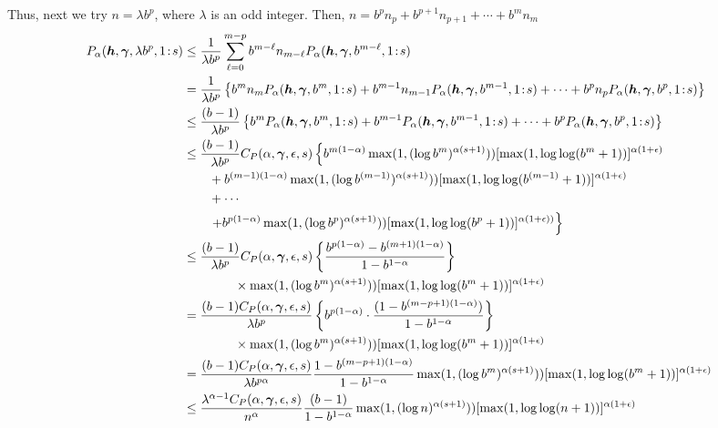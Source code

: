 \documentclass{iitthesis-au} %
\newcommand{\onetos}{1\!:\!s}
\newcommand{\FredNote}[1]{{\color{blue}#1}}
\begin{document}
Thus, next we try $n = \lambda b^p$, where $\lambda$ is an odd integer. Then, $n = b^pn_p + b^{p+1}n_{p+1} + \cdots + b^m n_m$
\begin{align*}
    P_\alpha(\vh,\vgamma,\lambda b^p,\onetos)
    & \le \frac {1}{\lambda b^p} \sum_{\ell = 0}^{m-p} b^{m-\ell} n_{m -\ell} P_\alpha(\vh,\vgamma,b^{m-\ell},\onetos) \\
    &= \frac {1}{\lambda b^p} \left\{b^m n_m P_\alpha(\vh,\vgamma,b^m,\onetos) + b^{m-1} n_{m-1} P_\alpha(\vh,\vgamma,b^{m-1},\onetos) + \cdots + b^p n_p P_\alpha(\vh,\vgamma,b^p,\onetos) 
    \right\} \\ 
    & \le \frac {(b-1)}{\lambda b^p} \left\{b^m  P_\alpha(\vh,\vgamma,b^m,\onetos) + b^{m-1}  P_\alpha(\vh,\vgamma,b^{m-1},\onetos) + \cdots + b^p  P_\alpha(\vh,\vgamma,b^p,\onetos) 
    \right\} \\ 
    & \le \frac {(b-1)}{\lambda b^p} C_{P}(\alpha,\vgamma,\epsilon,s) \left\{ b^{m(1-\alpha)}\max(1, (\log b^{m})^{\alpha(s+1)})) [\max(1,\log \log (
    b^m+1))]^{\alpha(1+\epsilon)}\right .\\ 
    & \qquad  + b^{(m-1)(1-\alpha)}\max(1, (\log b^{(m-1)})^{\alpha(s+1)})) [\max(1,\log \log (
    b^{(m-1)}+1))]^{\alpha(1+\epsilon)}\\
      &  \qquad + \cdots \\
      & \qquad  \left . +   b^{p(1-\alpha)}\max(1,(\log b^{p})^{\alpha(s+1)})) [\max(1,\log \log (b^p+1))]^{\alpha(1+\epsilon))}  \right\}\\
    & \le \frac {(b-1)}{\lambda b^p} C_{P}(\alpha,\vgamma,\epsilon,s) 
    \left\{\frac{b^{p(1-\alpha)} - b^{(m+1)(1- \alpha )}}{1 - b^{1 -\alpha}}\right\} \\
     & \qquad \qquad \times \max(1, (\log b^{m})^{\alpha(s+1)})) [\max(1,\log \log (
    b^m+1))]^{\alpha(1+\epsilon)} \\
    & = \frac { (b-1) C_{P}(\alpha, \vgamma, \epsilon,s)}{\lambda b^p} \left\{ b^{p(1-\alpha)} \cdot \frac{(1 - b^{(m-p+1)(1- \alpha )})}{1 - b^{1- \alpha}}\right\} \\
    & \qquad \qquad \times \max(1, (\log b^{m})^{\alpha(s+1)})) [\max(1,\log \log (
    b^m+1))]^{\alpha(1+\epsilon)} \\
    &=  \frac {(b-1)C_{P}(\alpha, \vgamma, \epsilon,s)}{\lambda b^{p\alpha}}  \frac{1 - b^{(m-p+1)(1- \alpha )}}{1 - b^{1- \alpha}} \max(1, (\log b^{m})^{\alpha(s+1)})) [\max(1,\log \log (
    b^m+1))]^{\alpha(1+\epsilon)} \\
    &\le \frac{\lambda^{\alpha -1}{C}_{P}(\alpha, \vgamma,\epsilon,s)}{n^{\alpha}}  \frac {(b-1)} {1 - b^{1- \alpha}}   \max(1, (\log n )^{\alpha(s+1)})) [\max(1,\log \log (
    n+1))]^{\alpha(1+\epsilon)}
\end{align*}
\end{document}
